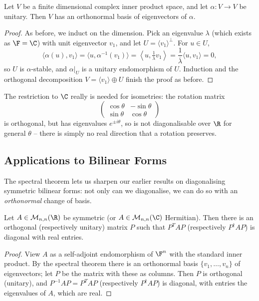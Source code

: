 \begin{theorem}
    Let $V$ be a finite dimensional complex inner product space, and let $\alpha: V \rightarrow V$ be unitary. Then $V$ has an orthonormal basis of eigenvectors of $\alpha$.
\end{theorem}
\begin{proof}
    As before, we induct on the dimension. Pick an eigenvalue $\lambda$ (which exists as $\F = \C$) with unit eigenvector $v_1$, and let $U = \langle v_1\rangle^\perp$. For $u \in U$,
    $$
    \langle \alpha(u), v_1 \rangle = \langle u, \alpha^{-1}(v_1)\rangle = \left\langle u, \tfrac{1}{\lambda}v_1 \right\rangle = \frac{1}{\overline{\lambda}}\langle u, v_1 \rangle = 0,
    $$
    so $U$ is $\alpha$-stable, and $\alpha|_U$ is a unitary endomorphism of $U$. Induction and the orthogonal decomposition $V = \langle v_1 \rangle \oplus U$ finish the proof as before.
\end{proof}

\begin{remark}
    The restriction to $\C$ really is needed for isometries: the rotation matrix
    $$
    \begin{pmatrix}
        \cos\theta & -\sin\theta \\ \sin\theta & \cos\theta
    \end{pmatrix}
    $$
    is orthogonal, but has eigenvalues $e^{\pm i\theta}$, so is not diagonalisable over $\R$ for general $\theta$ -- there is simply no real direction that a rotation preserves.
\end{remark}

\subsection{Applications to Bilinear Forms}

The spectral theorem lets us sharpen our earlier results on diagonalising symmetric bilinear forms: not only can we diagonalise, we can do so with an \emph{orthonormal} change of basis.

\begin{corollary}
    Let $A \in \mathcal{M}_{n,n}(\R)$ be symmetric (or $A \in \mathcal{M}_{n,n}(\C)$ Hermitian). Then there is an orthogonal (respectively unitary) matrix $P$ such that $P^TAP$ (respectively $P^\dagger A P$) is diagonal with real entries.
\end{corollary}
\begin{proof}
    View $A$ as a self-adjoint endomorphism of $\F^n$ with the standard inner product. By the spectral theorem there is an orthonormal basis $\{v_1, \dots, v_n\}$ of eigenvectors; let $P$ be the matrix with these as columns. Then $P$ is orthogonal (unitary), and $P^{-1}AP = P^TAP$ (respectively $P^\dagger AP$) is diagonal, with entries the eigenvalues of $A$, which are real.
\end{proof}

